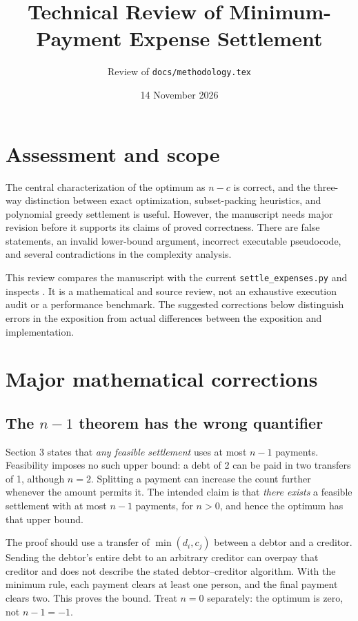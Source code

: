 \documentclass[11pt]{article}
\title{Technical Review of Minimum-Payment Expense Settlement}
\author{Review of \texttt{docs/methodology.tex}}
\date{14 November 2026}
\begin{document}
\maketitle

\section{Assessment and scope}

The central characterization of the optimum as $n-c$ is correct, and the
three-way distinction between exact optimization, subset-packing heuristics,
and polynomial greedy settlement is useful. However, the manuscript needs
major revision before it supports its claims of proved correctness. There
are false statements, an invalid lower-bound argument, incorrect executable
pseudocode, and several contradictions in the complexity analysis.

This review compares the manuscript with the current
\texttt{settle\_expenses.py} and inspects
. It is a mathematical and source
review, not an exhaustive execution audit or a performance benchmark.
The suggested corrections below distinguish errors in the exposition from
actual differences between the exposition and implementation.

\section{Major mathematical corrections}

\subsection{The $n-1$ theorem has the wrong quantifier}

Section 3 states that \emph{any feasible settlement} uses at most $n-1$
payments. Feasibility imposes no such upper bound: a debt of 2 can
be paid in two transfers of 1, although $n=2$. Splitting a payment can
increase the count further whenever the amount permits it. The intended
claim is that \emph{there exists} a feasible settlement with at most $n-1$
payments, for $n>0$, and hence the optimum has that upper bound.

The proof should use a transfer of
$\min(d_i,c_j)$ between a debtor and a creditor. Sending the debtor's
entire debt to an arbitrary creditor can overpay that creditor and does not
describe the stated debtor--creditor algorithm. With the minimum rule,
each payment clears at least one person, and the final payment clears two.
This proves the bound. Treat $n=0$ separately: the optimum is zero,
not $n-1=-1$.
\end{document}
